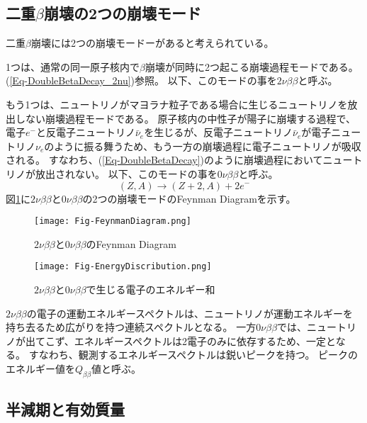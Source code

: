 \documentclass[a4paper,10pt]{jreport}
\begin{document}
\subsection{二重$\beta$崩壊の2つの崩壊モード}

二重$\beta$崩壊には2つの崩壊モードーがあると考えられている。

1つは、通常の同一原子核内で$\beta$崩壊が同時に2つ起こる崩壊過程モードである。
(\ref{Eq-DoubleBetaDecay_2nu})参照。
以下、このモードの事を$2\nu\beta\beta$と呼ぶ。

もう1つは、ニュートリノがマヨラナ粒子である場合に生じるニュートリノを放出しない崩壊過程モードである。
原子核内の中性子が陽子に崩壊する過程で、電子$e^-$と反電子ニュートリノ$\bar{\nu}_e$を生じるが、反電子ニュートリノ$\bar{\nu}_e$が電子ニュートリノ$\nu_e$のように振る舞うため、もう一方の崩壊過程に電子ニュートリノが吸収される。
すなわち、(\ref{Eq-DoubleBetaDecay})のように崩壊過程においてニュートリノが放出されない。
以下、このモードの事を$0\nu\beta\beta$と呼ぶ。
\begin{equation} \label{Eq-DoubleBetaDecay}
	(Z,A)\to(Z+2,A)+2e^-
\end{equation}
図\ref{Fig-FeynmanDiagram}に$2\nu\beta\beta$と$0\nu\beta\beta$の2つの崩壊モードのFeynman Diagramを示す。

\begin{figure}[H]
	\center
	\texttt{[image: Fig-FeynmanDiagram.png]}
	\caption{$2\nu\beta\beta$と$0\nu\beta\beta$のFeynman Diagram} \label{Fig-FeynmanDiagram}
\end{figure}

\begin{figure}[H]
	\center
	\texttt{[image: Fig-EnergyDiscribution.png]}
	\caption{$2\nu\beta\beta$と$0\nu\beta\beta$で生じる電子のエネルギー和} \label{Fig-EnergyDiscribution}
\end{figure}

$2\nu\beta\beta$の電子の運動エネルギースペクトルは、ニュートリノが運動エネルギーを持ち去るため広がりを持つ連続スペクトルとなる。
一方$0\nu\beta\beta$では、ニュートリノが出てこず、エネルギースペクトルは2電子のみに依存するため、一定となる。
すなわち、観測するエネルギースペクトルは鋭いピークを持つ。
ピークのエネルギー値を$Q_{\beta\beta}$値と呼ぶ。



\subsection{半減期と有効質量}
\end{document}
